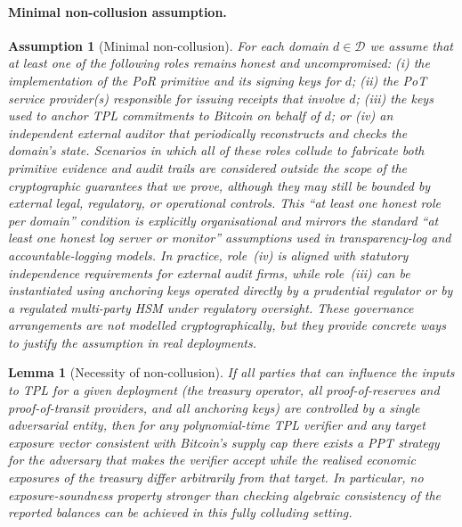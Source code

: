 \documentclass[11pt]{article}
\newtheorem{lemma}{Lemma}
\newtheorem{assumption}{Assumption}
\begin{document}
\paragraph{Minimal non-collusion assumption.}
\begin{assumption}[Minimal non-collusion]\label{assump:noncollusion}
For each domain $d \in \mathcal{D}$ we assume that at least one of the following roles remains honest and uncompromised:
(i) the implementation of the PoR primitive and its signing keys for $d$;
(ii) the PoT service provider(s) responsible for issuing receipts that involve $d$;
(iii) the keys used to anchor TPL commitments to Bitcoin on behalf of $d$; or
(iv) an independent external auditor that periodically reconstructs and checks the domain's state.
Scenarios in which all of these roles collude to fabricate both primitive evidence and audit trails are considered
outside the scope of the cryptographic guarantees that we prove, although they may still be bounded by external
legal, regulatory, or operational controls.
This ``at least one honest role per domain'' condition is explicitly organisational and mirrors the standard
``at least one honest log server or monitor'' assumptions used in transparency-log and accountable-logging models.
In practice, role~(iv) is aligned with statutory independence requirements for external audit firms, while role~(iii)
can be instantiated using anchoring keys operated directly by a prudential regulator or by a regulated multi-party HSM
under regulatory oversight.
These governance arrangements are not modelled cryptographically, but they provide concrete ways to justify the
assumption in real deployments.
\end{assumption}
\begin{lemma}[Necessity of non-collusion]
\label{lem:necessity-noncollusion}
If all parties that can influence the inputs to TPL for a given deployment (the treasury operator, all proof-of-reserves and proof-of-transit providers, and all anchoring keys) are controlled by a single adversarial entity, then for any polynomial-time TPL verifier and any target exposure vector consistent with Bitcoin's supply cap there exists a PPT strategy for the adversary that makes the verifier accept while the realised economic exposures of the treasury differ arbitrarily from that target.
In particular, no exposure-soundness property stronger than checking algebraic consistency of the reported balances can be achieved in this fully colluding setting.
\end{lemma}
\end{document}
